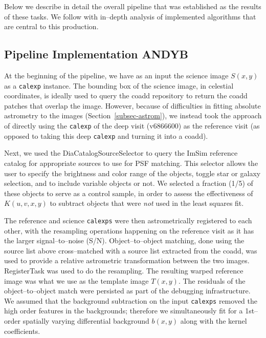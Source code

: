 \documentclass[prd, nofootinbib, floatfix, 11pt,tightenlines,times]{article}
\begin{document}
Below we describe in detail the overall pipeline that was established
as the results of these tasks.  We follow with in--depth analysis of
implemented algorithms that are central to this production.

\subsection{Pipeline Implementation {\bf ANDYB}}

At the beginning of the pipeline, we have as an input the science
image $S(x,y)$ as a {\tt calexp} instance.  The bounding box of the
science image, in celestial coordinates, is ideally used to query the
coadd repository to return the coadd patches that overlap the image.
However, because of difficulties in fitting absolute astrometry to the
images (Section~\ref{subsec-astrom}), we instead took the approach of
directly using the {\tt calexp} of the deep visit (v6866600) as the
reference visit (as opposed to taking this deep {\tt calexp} and
turning it into a coadd).

Next, we used the DiaCatalogSourceSelector to query the ImSim
reference catalog for appropriate sources to use for PSF matching.
This selector allows the user to specify the brightness and color
range of the objects, toggle star or galaxy selection, and to include
variable objects or not.  We selected a fraction (1/5) of these
objects to serve as a control sample, in order to assess the
effectiveness of $K(u,v,x,y)$ to subtract objects that were {\it not}
used in the least squares fit.

The reference and science {\tt calexps} were then astrometrically
registered to each other, with the resampling operations happening on
the reference visit as it has the larger signal--to--noise (S/N).
Object--to--object matching, done using the source list above
cross--matched with a source list extracted from the coadd, was used
to provide a relative astrometric transformation between the two
images.  RegisterTask was used to do the resampling.  The resulting
warped reference image was what we use as the template image $T(x,y)$.
The residuals of the object--to--object match were persisted as part
of the debugging infrastructure.  We assumed that the background
subtraction on the input {\tt calexps} removed the high order features
in the backgrounds; therefore we simultaneously fit for a 1st--order
spatially varying differential background $b(x,y)$ along with the
kernel coefficients.
\end{document}
